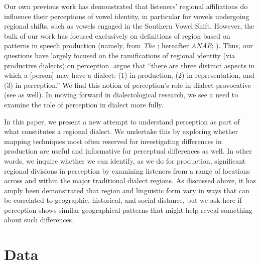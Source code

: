 \documentclass[output=paper]{LSP/langsci}
\begin{document}
Our own previous work \citep{fridland_exploring_2012, kendall_variation_2012} has demonstrated that listeners’ regional affiliations do influence their perceptions of vowel identity, in particular for vowels undergoing regional shifts, such as vowels engaged in the Southern Vowel Shift. However, the bulk of our work has focused exclusively on definitions of region based on patterns in speech production (namely, from \textit{The} \textit{}; hereafter \textit{ANAE}; \citealt{labov_atlas_2006-1}). Thus, our questions have largely focused on the ramifications of regional identity (via productive dialects) on perception. \citet[489]{sumner_effect_2009} argue that “there are three distinct aspects in which a [person] may have a dialect: (1) in production, (2) in representation, and (3) in perception.”  We find this notion of perception’s role in dialect provocative (see \citealt{kendall_mapping_2010} as well). In moving forward in dialectological research, we see a need to examine the role of perception in dialect more fully.

In this paper, we present a new attempt to understand perception as part of what constitutes a regional dialect. We undertake this by exploring whether mapping techniques most often reserved for investigating differences in production are useful and informative for perceptual differences as well. In other words, we inquire whether we can identify, as we do for production, significant regional divisions in perception by examining listeners from a range of locations across and within the major traditional dialect regions. As discussed above, it has amply been demonstrated that region and linguistic form vary in ways that can be correlated to geographic, historical, and social distance, but we ask here if perception shows similar geographical patterns that might help reveal something about such differences.

\section{Data}

\largerpage[-1]
\end{document}
